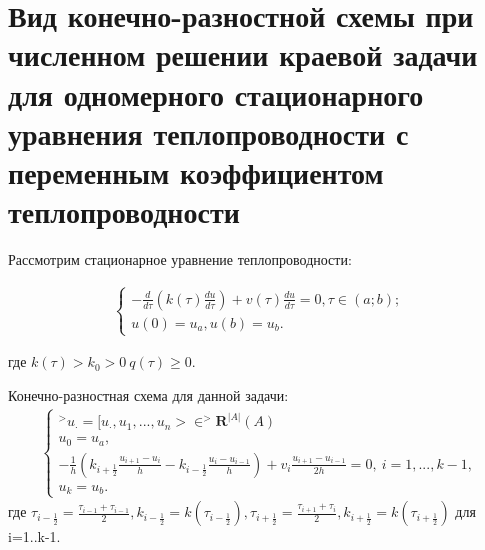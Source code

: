 \documentclass[__main__.tex]{subfiles}
\begin{document}
\section{Вид конечно-разностной схемы при численном решении краевой задачи для одномерного стационарного уравнения теплопроводности с переменным коэффициентом теплопроводности}

Рассмотрим стационарное уравнение теплопроводности:

\begin{gather}
	\begin{cases}
		-\frac{d}{d\tau}(k(\tau)\frac{du}{d\tau})+v(\tau)\frac{du}{d\tau}=0, \tau \in (a;b); \\
		u(0)=u_{a}, u(b)=u_{b}.
	\end{cases}
\end{gather}

где $k(\tau)>k_{0}>0 \  q(\tau) \geq 0.$

Конечно-разностная схема для данной задачи:
\begin{gather}
	\begin{cases}
		^>u_{\cdot}=[u_{\cdot}, u_{1},...,u_{n}>\in ^>\mathbf{R}^{|A|}(A)\\
		u_{0}=u_{a},\\
		-\frac{1}{h}(k_{i+\frac{1}{2}}\frac{u_{i+1}-u_{i}}{h}-k_{i-\frac{1}{2}}\frac{u_{i}-u_{i-1}}{h})+v_{i}\frac{u_{i+1}-u_{i-1}}{2h}=0, \ i=1,...,k-1,\\
		u_{k}=u_{b}.
	\end{cases}
\end{gather}
где $\tau_{i-\frac{1}{2}}=\frac{\tau_{i-1}+\tau_{i-1}}{2}, k_{i-\frac{1}{2}}=k(\tau_{i-\frac{1}{2}}),\tau_{i+\frac{1}{2}}=\frac{\tau_{i+1}+\tau_{i}}{2}, k_{i+\frac{1}{2}}=k(\tau_{i+\frac{1}{2}})$ для i=1..k-1. 
\end{document}
